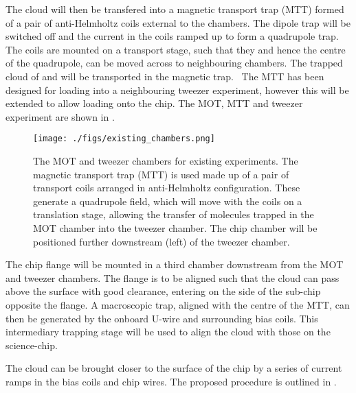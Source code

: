 The cloud will then be transfered into a magnetic transport trap (MTT) formed of
a pair of anti-Helmholtz coils external to the chambers. The dipole trap will be
switched off and the current in the coils ramped up to form a quadrupole trap.
The coils are mounted on a transport stage, such that they and hence the centre
of the quadrupole, can be moved across to neighbouring chambers. The trapped
cloud of  and  will be transported in the magnetic trap.~\cite{}
The MTT has been designed for loading into a neighbouring tweezer experiment,
however this will be extended to allow loading onto the chip. The MOT, MTT and
tweezer experiment are shown in . 

\begin{figure}[ht]
  \texttt{[image: ./figs/existing\_chambers.png]}
  \caption{
    The MOT and tweezer chambers for existing experiments. The magnetic
    transport trap (MTT) is used made up of a pair of transport coils arranged
    in anti-Helmholtz configuration. These generate a quadrupole field, which
    will move with the coils on a translation stage, allowing the transfer of
    molecules trapped in the MOT chamber into the tweezer chamber. The chip
    chamber will be positioned further downstream (left) of the tweezer chamber.
  }
  \label{experiment:fig:MTTsetup}
\end{figure}

The chip flange will be mounted in a third chamber downstream from the MOT and
tweezer chambers. The flange is to be aligned such that the cloud can pass above
the surface with good clearance, entering on the side of the sub-chip opposite
the flange. A macroscopic trap, aligned with the centre of the MTT, can then be
generated by the onboard U-wire and surrounding bias coils. This intermediary
trapping stage will be used to align the cloud with those on the science-chip.

The cloud can be brought closer to the surface of the chip by a series of
current ramps in the bias coils and chip wires. The proposed procedure is
outlined in .

